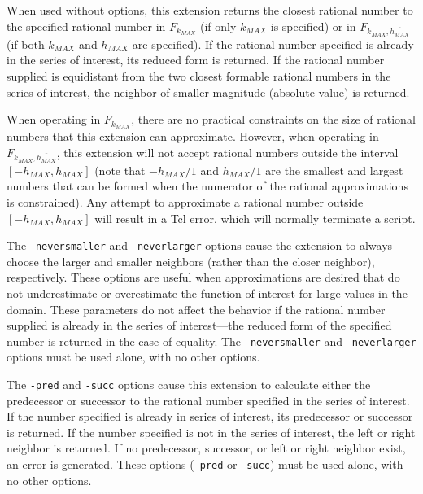 \begin{tclcommandsynopsis}
\end{tclcommandsynopsis}

\begin{tclcommanddescription}
When used without options, this extension returns the closest rational
number to the specified rational number in $F_{k_{MAX}}$ (if only $k_{MAX}$ is
specified) or in  $F_{k_{MAX}, \overline{h_{MAX}}}$ (if both 
$k_{MAX}$ and $h_{MAX}$ are specified).  If the rational number specified
is already in the series of interest, its reduced form is returned.
If the rational number supplied is equidistant from the two closest
formable rational numbers in the series of interest, the neighbor of smaller 
magnitude (absolute value) is returned.

When operating in $F_{k_{MAX}}$, there are no practical constraints 
on the size of rational numbers that this extension can approximate.
However, when operating in $F_{k_{MAX}, \overline{h_{MAX}}}$,
this extension will not accept rational numbers outside the
interval $[-h_{MAX}, h_{MAX}]$ (note that $-h_{MAX}/1$ and
$h_{MAX}/1$ are the smallest and largest numbers that can be formed
when the numerator of the rational approximations is constrained).
Any attempt to approximate a rational number outside $[-h_{MAX}, h_{MAX}]$
will result in a Tcl error, which will normally terminate a script.

The \texttt{-neversmaller} and \texttt{-neverlarger}
options cause the extension to always choose the larger and
smaller neighbors (rather than the closer neighbor), respectively.
These options are useful when approximations are desired that 
do not underestimate or overestimate the function of interest for
large values in the domain.  These parameters do not affect
the behavior if the rational number supplied is already in the
series of interest---the reduced form of the specified number
is returned in the case of equality.
The \texttt{-neversmaller} and \texttt{-neverlarger} options
must be used alone, with no other options.

The \texttt{-pred} and \texttt{-succ} options cause this extension
to calculate either the predecessor or successor to the rational
number specified in the series of interest.  If the number specified
is already in series of interest, its predecessor or successor 
is returned. 
If the number specified is not in the series of interest,
the left or right neighbor is returned.  If no predecessor,
successor, or left or right neighbor exist, an error is generated.
These options (\texttt{-pred} or \texttt{-succ})
must be used alone, with no other options.


\end{tclcommanddescription}
